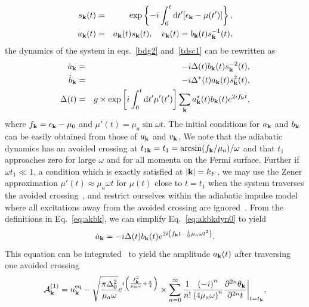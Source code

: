 \documentclass[a4paper,10pt]{report}
\begin{document}
\begin{eqnarray}
\label{eq:akbk}
s_{\bf k}(t) &=& \exp\left\{-i\int^t_0\mathrm{d}t' {\left[\epsilon_{\bf k}-\mu(t') \right]}\right\},\nonumber \\
u_{\bf k}(t) &=& a_{\bf k}(t) s_{\bf k}(t),\quad v_{\bf k}(t) =
b_{\bf k}(t) s^{-1}_{\bf k}(t),
\end{eqnarray}
the dynamics of the system in eqs.\ \ref{bdg2} and\ \ref{tdsc1} can be rewritten as
\begin{eqnarray}
\label{eq:akbkdyn0}
\dot{a}_{\bf k} &=& -i\Delta(t)b_{\bf k}(t) s^{-2}_{\bf k}(t),\nonumber \\
\dot{b}_{\bf k} &=& -i\Delta^\ast(t)a_{\bf k}(t) s^{2}_{\bf k}(t), \nonumber  \\
\Delta(t) &=& g \times \exp{\left[i\int^t_0{\mathrm d}t'\mu'(t')\right]} \sum_{\bf k}a^\ast_{\bf k}(t)b_{\bf k}(t)
e^{2if_{\bf k}t},
\end{eqnarray}
where $f_{\bf k}= \epsilon_{\bf k}-\mu_0$ and
$\mu'(t)=\mu_a\sin{\omega t}$. The initial conditions for $a_{\bf
k}$ and $b_{\bf k}$ can be easily obtained from those of $u_{\bf k}$
and $v_{\bf k}$. We note that the adiabatic dynamics has an avoided crossing at $t_{1{\bf
k}} = t_1 = \arcsin(f_{\bf k}/\mu_a)/\omega$ and that $t_1$
approaches zero for large $\omega$ and for all momenta on the Fermi
surface. Further if $\omega t_1 \ll 1$, a condition which is exactly
satisfied at $|{\bf k}|=k_F$, we may use the Zener approximation
$\mu'(t)\approx\mu_a\omega t$ for $\mu(t)$ close to $t=t_1$ when the
system traverses the avoided
crossing~\cite{review:lzstls},
and restrict ourselves within the adiabatic impulse model where all
excitations away from the avoided crossing are
ignored~\cite{review:lzstls}. From the definitions in Eq.\
\ref{eq:akbk}, we can simplify Eq.\
\ref{eq:akbkdyn0} to yield
\begin{equation}
\label{eq:akdyn} \dot{a}_{\bf k} = -i\Delta(t) b_{\bf k}(t)
e^{2i\left(f_{\bf k}t-\frac{1}{2}\mu_a\omega t^2\right)}.
\end{equation}
This equation can be integrated~\cite{mypaper2} to yield the amplitude $a_{\bf k}(t)$ after traversing one avoided crossing
\begin{equation}
\label{eq:afkfinal} \mathcal{A}^{(1)}_{\bf k} = u^{\rm eq}_{\bf
k}- \sqrt{\frac{\pi\Delta^2_0}{\mu_a\omega}}
e^{i\left(\frac{f^2_{\bf
k}}{\mu_a\omega}+\frac{\pi}{4}\right)}  \times \sum^\infty_{n=0} \frac{1}{n!}
\frac{\left(-i\right)^n}{\left(4\mu_a\omega\right)^n}
\frac{\partial^{2n}\theta_{\bf k}}{\partial^{2n}t}\bigg|_{t=t_{\bf
k}},
\end{equation}
\end{document}

